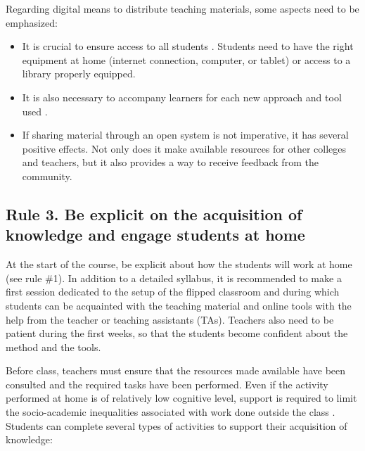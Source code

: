 \documentclass[10pt,letterpaper]{article}
\begin{document}
Regarding digital means to distribute teaching materials, some aspects need to be emphasized:

\begin{itemize}

\item  It is crucial to ensure access to all students \cite{lo_critical_2017}. 
Students need to have the right equipment at home (internet connection, computer, or tablet) 
or access to a library properly equipped.

\item It is also necessary to accompany learners for each new approach and tool used \cite{lo_critical_2017}.

\item If sharing material through an open system is not imperative, it has several positive effects. 
Not only does it make available resources for other colleges and teachers, 
but it also provides a way to receive feedback from the community.

\end{itemize}

\subsection{Rule 3. Be explicit on the acquisition of knowledge and engage students at home}

At the start of the course, be explicit about how the students will
work at home (see rule \#1). In addition to a detailed syllabus, it is
recommended to make a first session dedicated to the setup of the
flipped classroom and during which students can be acquainted with the teaching material
and online tools with the help from the teacher or teaching assistants (TAs).
Teachers also need to be patient during the first weeks, so that the
students become confident about the method and the tools.

Before class, teachers must ensure that the resources made available
have been consulted \cite{lo_critical_2017} and the required tasks have been performed. 
Even if the activity performed at home is of relatively low cognitive level, 
support is required to limit the socio-academic inequalities associated 
with work done outside the class \cite{rayou_faire_2010}. 
Students can complete several types of activities to support their acquisition of knowledge:
\end{document}
